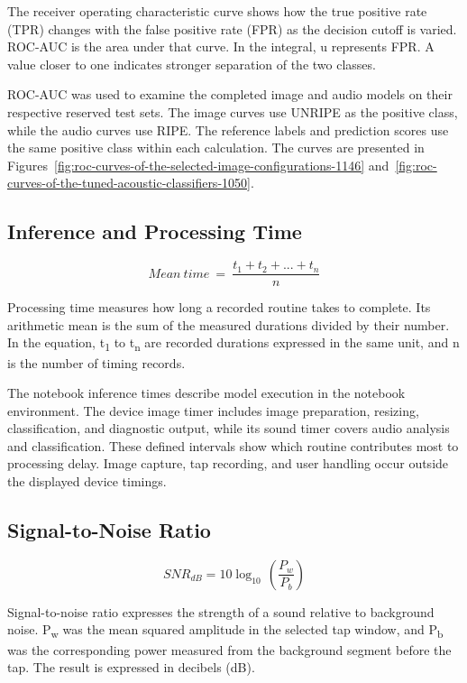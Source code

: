 \begin{thesisprose}
The receiver operating characteristic curve shows how the true positive rate (TPR) changes with the false positive rate (FPR) as the decision cutoff is varied. ROC-AUC is the area under that curve. In the integral, u represents FPR. A value closer to one indicates stronger separation of the two classes.

ROC-AUC was used to examine the completed image and audio models on their respective reserved test sets. The image curves use UNRIPE as the positive class, while the audio curves use RIPE. The reference labels and prediction scores use the same positive class within each calculation. The curves are presented in Figures~\ref{fig:roc-curves-of-the-selected-image-configurations-1146} and~\ref{fig:roc-curves-of-the-tuned-acoustic-classifiers-1050}.

\subsection{Inference and Processing Time}

\begin{equation}
  Mean\ time\  = \ \frac{t_{1} + t_{2} + ... + t_{n}}{n}
  \label{eq:formula-632}
\end{equation}

Processing time measures how long a recorded routine takes to complete. Its arithmetic mean is the sum of the measured durations divided by their number. In the equation, t\textsubscript{1} to t\textsubscript{n} are recorded durations expressed in the same unit, and n is the number of timing records.

The notebook inference times describe model execution in the notebook environment. The device image timer includes image preparation, resizing, classification, and diagnostic output, while its sound timer covers audio analysis and classification. These defined intervals show which routine contributes most to processing delay. Image capture, tap recording, and user handling occur outside the displayed device timings.

\subsection{Signal-to-Noise Ratio}

\begin{equation}
  {SNR}_{dB} = 10\log_{10\ }(\frac{P_{w}}{P_{b}})
  \label{eq:formula-636}
\end{equation}

Signal-to-noise ratio expresses the strength of a sound relative to background noise. P\textsubscript{w} was the mean squared amplitude in the selected tap window, and P\textsubscript{b} was the corresponding power measured from the background segment before the tap. The result is expressed in decibels (dB).


\end{thesisprose}

